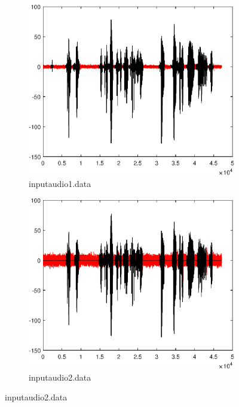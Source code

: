 \documentclass[10pt,twocolumn]{article}
\begin{document}
{\begin{figure}[ht]
  \centering
  \begin{subfigure}{0.45\linewidth}
    \centering
    \includegraphics[scale=0.3]{images/res1.eps}
    \caption{inputaudio1.data}
  \end{subfigure}
\begin{subfigure}{0.45\linewidth}
    \centering
    \includegraphics[scale=0.3]{images/res2.eps}
    \caption{inputaudio2.data}
  \end{subfigure}
  \par\medskip

\end{figure}}
\end{document}
